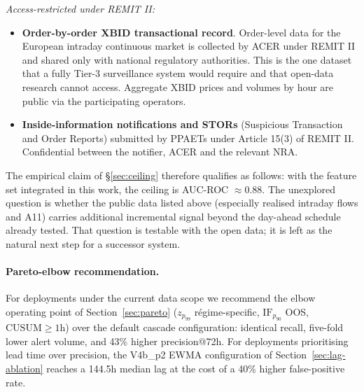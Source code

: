 \documentclass[11pt,a4paper]{article}
\begin{document}
\textit{Access-restricted under REMIT II:}
\begin{itemize}
\item \textbf{Order-by-order XBID transactional record}.
Order-level data for the European intraday continuous market is
collected by ACER under REMIT II and shared only with national
regulatory authorities. This is the one dataset that a fully
Tier-3 surveillance system would require and that open-data
research cannot access. Aggregate XBID prices and volumes by hour
are public via the participating operators.
\item \textbf{Inside-information notifications and STORs}
(Suspicious Transaction and Order Reports) submitted by PPAETs
under Article 15(3) of REMIT II. Confidential between the
notifier, ACER and the relevant NRA.
\end{itemize}

The empirical claim of §\ref{sec:ceiling} therefore qualifies as
follows: with the feature set integrated in this work, the ceiling
is AUC-ROC $\approx 0.88$. The unexplored question is whether the
public data listed above (especially realised intraday flows and
A11) carries additional incremental signal beyond the day-ahead
schedule already tested. That question is testable with the open
data; it is left as the natural next step for a successor system.

\paragraph{Pareto-elbow recommendation.} For deployments under the
current data scope we recommend the elbow operating point of
Section~\ref{sec:pareto}
($z_{p_{99}}$ régime-specific, $\mathrm{IF}_{p_{90}}$ OOS,
$\mathrm{CUSUM} \geq 1$h) over the default cascade configuration:
identical recall, five-fold lower alert volume, and 43\% higher
precision@72h. For deployments prioritising lead time over
precision, the V4b\_p2 EWMA configuration of
Section~\ref{sec:lag-ablation} reaches a 144.5h median lag at the
cost of a 40\% higher false-positive rate.



\end{document}
